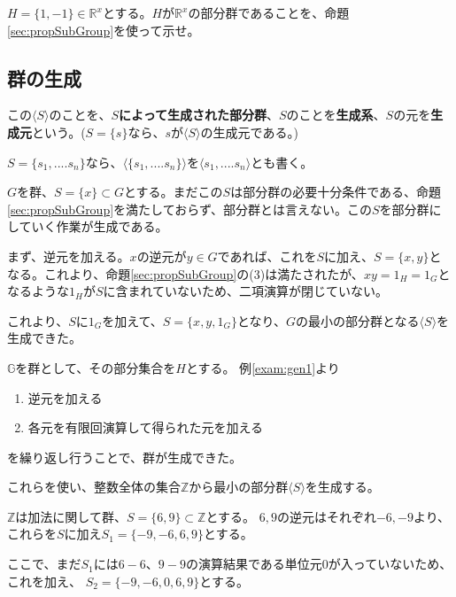 \documentclass[dvipdfmx,autodetect-engine]{jsarticle}
\begin{document}
\ques $H = \{1, -1\} \in \mathbb{R}^{x}$とする。$H$が$\mathbb{R}^{x}$の部分群であることを、命題\ref{sec:propSubGroup}を使って示せ。


\subsection{群の生成}

 この$\langle S \rangle$のことを、{\bf $S$によって生成された部分群}、$S$のことを{\bf 生成系}、$S$の元を{\bf 生成元}という。($S = \{s\}$なら、$s$が$\langle S \rangle$の生成元である。)

$S = \{s_{1}, .... s_{n}  \}$なら、$\langle \{s_{1}, .... s_{n}  \} \rangle$を$\langle s_{1}, .... s_{n} \rangle$とも書く。


$G$を群、$S = \{x\} \subset G$とする。まだこの$S$は部分群の必要十分条件である、命題\ref{sec:propSubGroup}を満たしておらず、部分群とは言えない。この$S$を部分群にしていく作業が生成である。

まず、逆元を加える。$x$の逆元が$y \in G$であれば、これを$S$に加え、$S = \{x, y\}$となる。これより、命題\ref{sec:propSubGroup}の(3)は満たされたが、$x y = 1_{H} = 1_{G}$となるような$1_{H}$が$S$に含まれていないため、二項演算が閉じていない。

これより、$S$に$1_{G}$を加えて、$S=\{x, y, 1_{G}\}$となり、$G$の最小の部分群となる$\langle S \rangle$を生成できた。


$\mathbb{G}$を群として、その部分集合を$H$とする。
例\ref{exam:gen1}より

\begin{enumerate}
\renewcommand{\labelenumi}{(\arabic{enumi})}
\item 逆元を加える
\item 各元を有限回演算して得られた元を加える
\end{enumerate}

を繰り返し行うことで、群が生成できた。

これらを使い、整数全体の集合$\mathbb{Z}$から最小の部分群$\langle S \rangle$を生成する。

$\mathbb{Z}$は加法に関して群、$S = \{6, 9\} \subset \mathbb{Z}$とする。
$6, 9$の逆元はそれぞれ$-6, -9$より、これらを$S$に加え$S_{1} = \{-9, -6, 6, 9\}$とする。

ここで、まだ$S_{1}$には$6-6$、$9-9$の演算結果である単位元$0$が入っていないため、これを加え、
$S_{2} = \{-9, -6, 0, 6, 9\}$とする。
\end{document}
